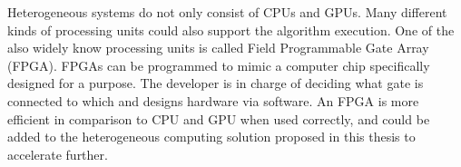 Heterogeneous systems do not only consist of CPUs and GPUs. Many different kinds of processing units could also support the algorithm execution. One of the also widely know processing units is called Field Programmable Gate Array (FPGA). FPGAs can be programmed to mimic a computer chip specifically designed for a purpose. The developer is in charge of deciding what gate is connected to which and designs hardware via software. An FPGA is more efficient in comparison to CPU and GPU when used correctly, \cite{qasaimehComparingEnergyEfficiency2019} and could be added to the heterogeneous computing solution proposed in this thesis to accelerate further.
% 